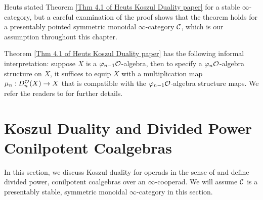 \begin{remark}
Heuts stated Theorem \ref{Thm 4.1 of Heuts Koszul Duality paper} for a stable $\infty$-category, but a careful examination of the proof shows that the theorem holds for a presentably pointed symmetric monoidal $\infty$-category ${\mathcal{C}}$, which is our assumption throughout this chapter.
\end{remark}

\begin{remark}
Theorem \ref{Thm 4.1 of Heuts Koszul Duality paper} has the following informal interpretation: suppose $X$ is a $\varphi_{n-1}{\mathcal{O}}$-algebra, then to specify a $\varphi_n{\mathcal{O}}$-algebra structure on $X$, it suffices to equip $X$ with a multiplication map $\mu_n: D^{{\mathcal{O}}}_n(X)\to X$ that is compatible with the $\varphi_{n-1}{\mathcal{O}}$-algebra structure maps. We refer the readers to \cite{Heuts_Koszul} for further details.
\end{remark}





\section{Koszul Duality and Divided Power Conilpotent  Coalgebras }
\label{Coalgebras over cooperads and Koszul Duality}
In this section, we discuss Koszul duality for operads in the sense of \cite{Ginzburg-Kapranov} and define divided power, conilpotent coalgebras over an $\infty$-cooperad. 
We will assume ${\mathcal{C}}$ is a presentably stable, symmetric monoidal $\infty$-category in this section.

